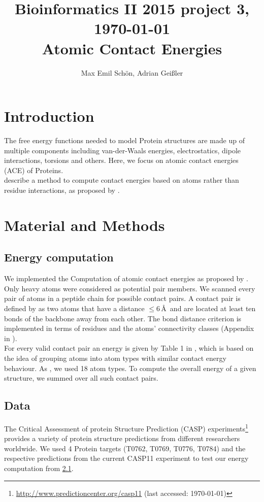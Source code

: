 \documentclass[11pt,a4paper]{article}
\newcommand{\fnurl}[2]{\footnote{\url{#1} (last accessed: #2)}} %
\renewcommand{\(}{\left (}
\renewcommand{\)}{\right )}
\begin{document}
\title{
  {\small Bioinformatics II 2015 \hfill project 3, \today}\\
   Atomic Contact Energies
}

\author{
Max Emil Schön, Adrian Geißler
}

\maketitle




\section{Introduction}
The free energy functions needed to model Protein structures are made up of multiple components including van-der-Waals energies, electrostatics, dipole interactions, torsions and others. Here, we focus on atomic contact energies (ACE) of Proteins.\\
\cite{Zhang1997} describe a method to compute contact energies based on atoms rather than residue interactions, as proposed by \citet{Miyazawa1996}. 
\section{Material and Methods}
\subsection{Energy computation}\label{energies}
We implemented the Computation of atomic contact energies as proposed by \citet{Zhang1997}. Only heavy atoms were considered as potential pair members. We scanned every pair of atoms in a peptide chain for possible contact pairs. A contact pair is defined by \citet{Zhang1997} as two atoms that have a distance $\leq 6$\,\AA\ and are located at least ten bonds of the backbone away from each other. The bond distance criterion is implemented in terms of residues and the atoms' connectivity classes (Appendix in \citet{Zhang1997}). \\
For every valid contact pair an energy is given by Table 1 in \citet{Zhang1997}, which is based on the idea of grouping atoms into atom types with similar contact energy behaviour. As \citet{Zhang1997}, we used 18 atom types. To compute the overall energy of a given structure, we summed over all such contact pairs.
\subsection{Data}
The Critical Assessment of protein Structure Prediction (CASP) experiments\fnurl{http://www.predictioncenter.org/casp11}{\today} provides a variety of protein structure predictions from different researchers worldwide. We used 4 Protein targets (T0762, T0769, T0776, T0784) and the respective predictions from the current CASP11 experiment to test our energy computation from \ref{energies}.
\end{document}

